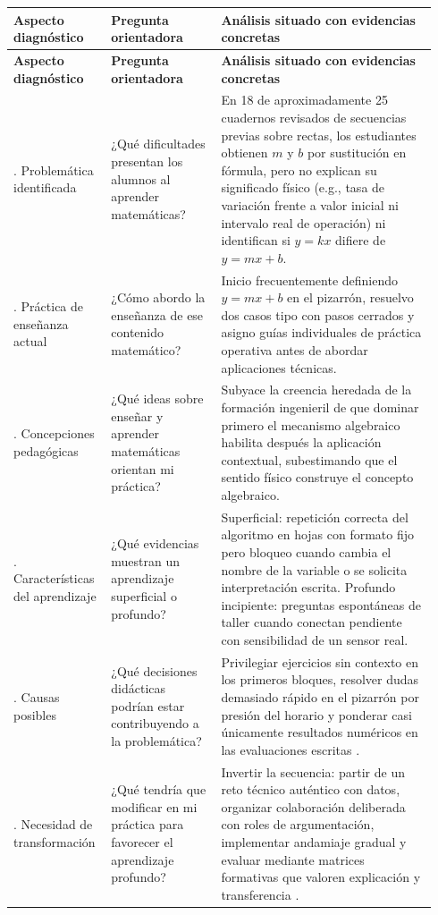 \documentclass[spanish,letterpaper,oneside]{article}
\begin{document}
{\small{}\renewcommand{\arraystretch}{1.35}
\begin{longtable}{|>{\raggedright\arraybackslash}p{0.20\linewidth}|>{\raggedright\arraybackslash}p{0.25\linewidth}|>{\raggedright\arraybackslash}p{0.49\linewidth}|}\hline
\rowcolor{iiiepePale} \textbf{Aspecto diagnóstico} & \textbf{Pregunta orientadora} & \textbf{Análisis situado con evidencias concretas} \\\hline
\endfirsthead
\hline
\rowcolor{iiiepePale} \textbf{Aspecto diagnóstico} & \textbf{Pregunta orientadora} & \textbf{Análisis situado con evidencias concretas} \\\hline
\endhead
1. Problemática identificada & ¿Qué dificultades presentan los alumnos al aprender matemáticas? & En 18 de aproximadamente 25 cuadernos revisados de secuencias previas sobre rectas, los estudiantes obtienen $m$ y $b$ por sustitución en fórmula, pero no explican su significado físico (e.g., tasa de variación frente a valor inicial ni intervalo real de operación) ni identifican si $y=kx$ difiere de $y=mx+b$. \\\hline
2. Práctica de enseñanza actual & ¿Cómo abordo la enseñanza de ese contenido matemático? & Inicio frecuentemente definiendo $y=mx+b$ en el pizarrón, resuelvo dos casos tipo con pasos cerrados y asigno guías individuales de práctica operativa antes de abordar aplicaciones técnicas. \\\hline
3. Concepciones pedagógicas & ¿Qué ideas sobre enseñar y aprender matemáticas orientan mi práctica? & Subyace la creencia heredada de la formación ingenieril de que dominar primero el mecanismo algebraico habilita después la aplicación contextual, subestimando que el sentido físico construye el concepto algebraico. \\\hline
4. Características del aprendizaje & ¿Qué evidencias muestran un aprendizaje superficial o profundo? & Superficial: repetición correcta del algoritmo en hojas con formato fijo pero bloqueo cuando cambia el nombre de la variable o se solicita interpretación escrita. Profundo incipiente: preguntas espontáneas de taller cuando conectan pendiente con sensibilidad de un sensor real. \\\hline
5. Causas posibles & ¿Qué decisiones didácticas podrían estar contribuyendo a la problemática? & Privilegiar ejercicios sin contexto en los primeros bloques, resolver dudas demasiado rápido en el pizarrón por presión del horario y ponderar casi únicamente resultados numéricos en las evaluaciones escritas \citep{eef2017mathematics}. \\\hline
6. Necesidad de transformación & ¿Qué tendría que modificar en mi práctica para favorecer el aprendizaje profundo? & Invertir la secuencia: partir de un reto técnico auténtico con datos, organizar colaboración deliberada con roles de argumentación, implementar andamiaje gradual y evaluar mediante matrices formativas que valoren explicación y transferencia \citep{eef2021feedback}. \\\hline
\end{longtable}}
\end{document}
